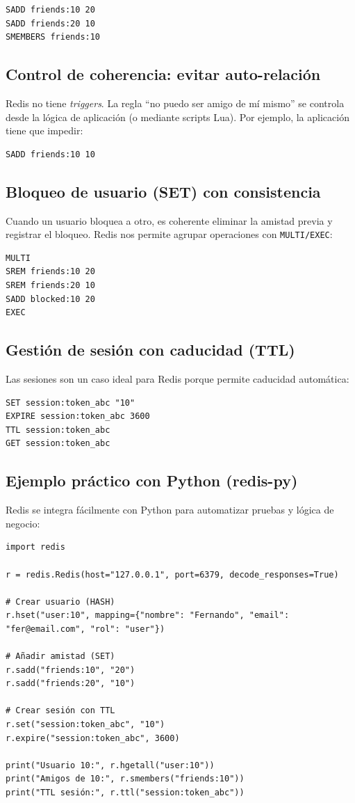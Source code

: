 \begin{verbatim}
SADD friends:10 20
SADD friends:20 10
SMEMBERS friends:10
\end{verbatim}

\subsection{Control de coherencia: evitar auto-relación}
Redis no tiene \textit{triggers}. La regla “no puedo ser amigo de mí mismo” se controla desde la lógica de aplicación (o mediante scripts Lua). Por ejemplo, la aplicación tiene que impedir:
\begin{verbatim}
SADD friends:10 10
\end{verbatim}

\subsection{Bloqueo de usuario (SET) con consistencia}
Cuando un usuario bloquea a otro, es coherente eliminar la amistad previa y registrar el bloqueo. Redis nos permite agrupar operaciones con \texttt{MULTI/EXEC}:

\begin{verbatim}
MULTI
SREM friends:10 20
SREM friends:20 10
SADD blocked:10 20
EXEC
\end{verbatim}

\subsection{Gestión de sesión con caducidad (TTL)}
Las sesiones son un caso ideal para Redis porque permite caducidad automática:

\begin{verbatim}
SET session:token_abc "10"
EXPIRE session:token_abc 3600
TTL session:token_abc
GET session:token_abc
\end{verbatim}

\subsection{Ejemplo práctico con Python (redis-py)}
Redis se integra fácilmente con Python para automatizar pruebas y lógica de negocio:

\begin{verbatim}
import redis

r = redis.Redis(host="127.0.0.1", port=6379, decode_responses=True)

# Crear usuario (HASH)
r.hset("user:10", mapping={"nombre": "Fernando", "email": "fer@email.com", "rol": "user"})

# Añadir amistad (SET)
r.sadd("friends:10", "20")
r.sadd("friends:20", "10")

# Crear sesión con TTL
r.set("session:token_abc", "10")
r.expire("session:token_abc", 3600)

print("Usuario 10:", r.hgetall("user:10"))
print("Amigos de 10:", r.smembers("friends:10"))
print("TTL sesión:", r.ttl("session:token_abc"))
\end{verbatim}


